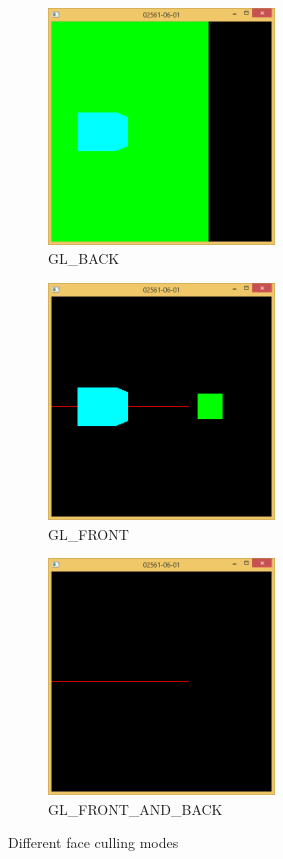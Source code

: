 \begin{figure}
        \centering
        \begin{subfigure}[b]{0.4\textwidth}
                \includegraphics[width=6cm]{../Screenshots/ex-6/1b-1.png}
                \caption{GL\_BACK}
                \label{fig:6-1-2-1}
        \end{subfigure}

        \begin{subfigure}[b]{0.4\textwidth}
                \includegraphics[width=6cm]{../Screenshots/ex-6/1b-2.png}
                \caption{GL\_FRONT}
                \label{fig:6-1-2-2}
        \end{subfigure}

        \begin{subfigure}[b]{0.4\textwidth}
                \includegraphics[width=6cm]{../Screenshots/ex-6/1b-3.png}
                \caption{GL\_FRONT\_AND\_BACK}
                \label{fig:6-1-2-3}
        \end{subfigure}
        \caption{Different face culling modes}\label{fig:6-1-2}
\end{figure}

